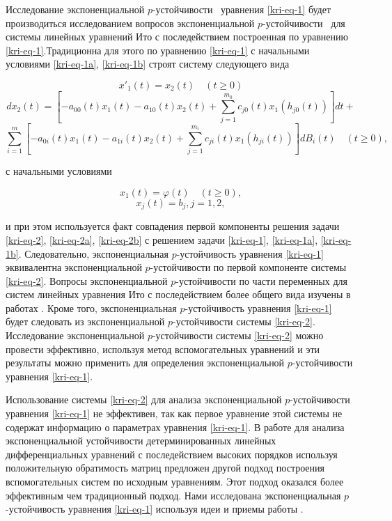Исследование экспоненциальной  $p${}-устойчивости \ уравнения \eqref{kri-eq-1} будет производиться исследованием вопросов
экспоненциальной  $p${}-устойчивости \ для системы линейных уравнений Ито с последействием построенная по уравнению
\eqref{kri-eq-1}.Традиционна для этого по уравнению \eqref{kri-eq-1} с начальными условиями \eqref{kri-eq-1a}, \eqref{kri-eq-1b} строят систему следующего вида

\begin{equation*}
	x'_1(t) = x_2(t)\quad(t\ge0)
\end{equation*}
\begin{equation}\label{kri-eq-2}
	dx_2(t) = \left[-a_{00}(t)x_1(t) - a_{10}(t)x_2(t) + \sum_{j=1}^{m_0}c_{j0}(t)x_1(h_{j0}(t))\right]dt +
\end{equation}
\begin{equation*}
	\sum_{i=1}^{m} \left[-a_{0i}(t)x_1(t)-a_{1i}(t)x_2(t)+\sum_{j=1}^{m_i}c_{ji}(t)x_1(h_{ji}(t))\right]dB_i(t) \quad (t \ge 0),
\end{equation*}

с начальными условиями

\begin{equation}\label{kri-eq-2a}
	x_1(t)=\varphi (t)\quad(t\ge 0),
\end{equation}
\begin{equation}\label{kri-eq-2b}
	x_j(t)=b_j, j=1,2,
\end{equation}

и при этом используется факт совпадения первой компоненты решения задачи \eqref{kri-eq-2}, \eqref{kri-eq-2a}, \eqref{kri-eq-2b} с решением задачи \eqref{kri-eq-1}, \eqref{kri-eq-1a},
\eqref{kri-eq-1b}. Следовательно, экспоненциальная  $p$-\linebreak устойчивость уравнения \eqref{kri-eq-1} эквивалентна экспоненциальной
$p${}-устойчивости по первой компоненте системы \eqref{kri-eq-2}. Вопросы экспоненциальной  $p${}-устойчивости по части переменных
для систем линейных уравнения Ито с последействием более общего вида изучены в работах \cite{kri-bib-19, kri-bib-20}. Кроме того,
экспоненциальная  $p${}-устойчивость уравнения \eqref{kri-eq-1} будет следовать из экспоненциальной  $p${}-устойчивости системы \eqref{kri-eq-2}.
Исследование экспоненциальной  $p${}-устойчивости системы \eqref{kri-eq-2} можно провести эффективно, используя метод
вспомогательных уравнений и эти результаты можно применить для определения экспоненциальной  $p${}-устойчивости
уравнения \eqref{kri-eq-1}.

Использование системы \eqref{kri-eq-2} для анализа экспоненциальной  $p${}-устойчивости уравнения \eqref{kri-eq-1} не эффективен, так как первое
уравнение этой системы не содержат информацию о параметрах уравнения \eqref{kri-eq-1}. В работе \cite{kri-bib-16} для анализа экспоненциальной
устойчивости детерминированных линейных дифференциальных уравнений с последействием высоких порядков используя
положительную обратимость матриц предложен другой подход построения вспомогательных систем по исходным уравнениям. Этот
подход оказался более эффективным чем традиционный подход. Нами исследована экспоненциальная  $p${}-устойчивость
уравнения \eqref{kri-eq-1} используя идеи и приемы работы \cite{kri-bib-16}.

